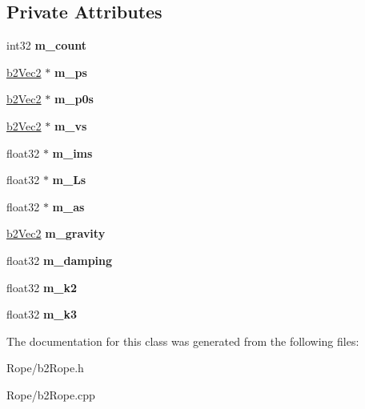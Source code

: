 \subsection*{Private Attributes}
\begin{DoxyCompactItemize}
\item 
\mbox{\label{classb2Rope_a25cf0ed66027fcd262714cc95589a62f}} 
int32 {\bfseries m\+\_\+count}
\item 
\mbox{\label{classb2Rope_ac86bcba951cc7e5db5504e4c9af1f0a4}} 
\mbox{\hyperlink{structb2Vec2}{b2\+Vec2}} $\ast$ {\bfseries m\+\_\+ps}
\item 
\mbox{\label{classb2Rope_a3658cb1686cb50494e50dfc38ed43290}} 
\mbox{\hyperlink{structb2Vec2}{b2\+Vec2}} $\ast$ {\bfseries m\+\_\+p0s}
\item 
\mbox{\label{classb2Rope_a228257fb879daf4e5b73d2c279a37c58}} 
\mbox{\hyperlink{structb2Vec2}{b2\+Vec2}} $\ast$ {\bfseries m\+\_\+vs}
\item 
\mbox{\label{classb2Rope_a1854a191ae97904ba8182ba45b362d4d}} 
float32 $\ast$ {\bfseries m\+\_\+ims}
\item 
\mbox{\label{classb2Rope_a73204bb0635c44c437c6724fb2a28b6d}} 
float32 $\ast$ {\bfseries m\+\_\+\+Ls}
\item 
\mbox{\label{classb2Rope_a777771aa70d1b0717b1df3e0cae161de}} 
float32 $\ast$ {\bfseries m\+\_\+as}
\item 
\mbox{\label{classb2Rope_a982d2a7545454b62ab0a2b5eeb33b48c}} 
\mbox{\hyperlink{structb2Vec2}{b2\+Vec2}} {\bfseries m\+\_\+gravity}
\item 
\mbox{\label{classb2Rope_ac5bf18e49983f50ac6fbd3acbe954ccd}} 
float32 {\bfseries m\+\_\+damping}
\item 
\mbox{\label{classb2Rope_ab37ff9d1d0485be2d670b090c067ab81}} 
float32 {\bfseries m\+\_\+k2}
\item 
\mbox{\label{classb2Rope_a7226de25915cfa1b7d216b46f30e2d22}} 
float32 {\bfseries m\+\_\+k3}
\end{DoxyCompactItemize}


The documentation for this class was generated from the following files\+:\begin{DoxyCompactItemize}
\item 
Rope/b2\+Rope.\+h\item 
Rope/b2\+Rope.\+cpp\end{DoxyCompactItemize}
